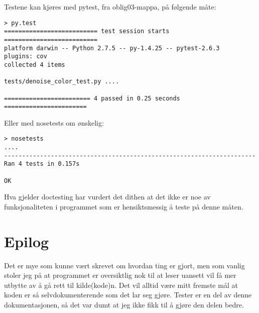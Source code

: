 \documentclass{article}
\begin{document}
Testene kan kjøres med pytest, fra oblig03-mappa, på følgende måte:
\begin{Verbatim}[numbers=none,frame=lines,label=\fbox{{\tiny Terminal}},fontsize=\fontsize{9pt}{9pt},
labelposition=topline,framesep=2.5mm,framerule=0.7pt]
> py.test
========================== test session starts ==========================
platform darwin -- Python 2.7.5 -- py-1.4.25 -- pytest-2.6.3
plugins: cov
collected 4 items

tests/denoise_color_test.py ....

======================== 4 passed in 0.25 seconds =======================
\end{Verbatim}
\noindent

Eller med nosetests om ønskelig:
\begin{Verbatim}[numbers=none,frame=lines,label=\fbox{{\tiny Terminal}},fontsize=\fontsize{9pt}{9pt},
labelposition=topline,framesep=2.5mm,framerule=0.7pt]
> nosetests
....
----------------------------------------------------------------------
Ran 4 tests in 0.157s

OK
\end{Verbatim}
\noindent

Hva gjelder doctesting har vurdert det dithen at det ikke er noe av funksjonaliteten
i programmet som er hensiktsmessig å teste på denne måten.

\section*{Epilog}
Det er mye som kunne vært skrevet om hvordan ting er gjort,
men som vanlig stoler jeg på at programmet er oversiktlig nok
til at leser uansett vil få mer utbytte av å gå rett til kilde(kode)n.
Det vil alltid være mitt fremste mål at koden er så selvdokumenterende
som det lar seg gjøre. Tester er en del av denne dokumentasjonen, så det
var dumt at jeg ikke fikk til å gjøre den delen bedre.
\end{document}
